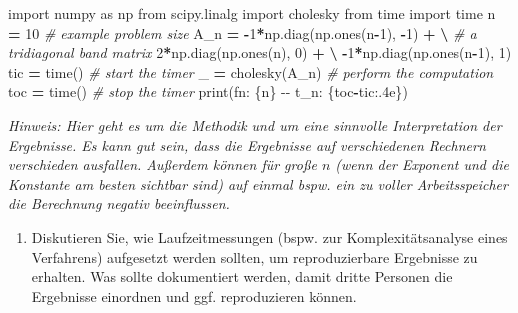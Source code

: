 \documentclass[
]{book}
\newenvironment{Shaded}{\begin{snugshade}}{\end{snugshade}}
\newcommand{\BuiltInTok}[1]{#1}
\newcommand{\CommentTok}[1]{\textcolor[rgb]{0.56,0.35,0.01}{\textit{#1}}}
\newcommand{\DecValTok}[1]{\textcolor[rgb]{0.00,0.00,0.81}{#1}}
\newcommand{\ImportTok}[1]{#1}
\newcommand{\NormalTok}[1]{#1}
\newcommand{\OperatorTok}[1]{\textcolor[rgb]{0.81,0.36,0.00}{\textbf{#1}}}
\newcommand{\SpecialCharTok}[1]{\textcolor[rgb]{0.00,0.00,0.00}{#1}}
\newcommand{\SpecialStringTok}[1]{\textcolor[rgb]{0.31,0.60,0.02}{#1}}
\providecommand{\tightlist}{%
  \setlength{\itemsep}{0pt}\setlength{\parskip}{0pt}}
\theoremstyle{definition}
\theoremstyle{definition}
\theoremstyle{definition}
\theoremstyle{definition}
\theoremstyle{remark}
\begin{document}
\begin{Shaded}
\begin{Highlighting}[]
\ImportTok{import}\NormalTok{ numpy }\ImportTok{as}\NormalTok{ np}
\ImportTok{from}\NormalTok{ scipy.linalg }\ImportTok{import}\NormalTok{ cholesky}
\ImportTok{from}\NormalTok{ time }\ImportTok{import}\NormalTok{ time}
\NormalTok{n }\OperatorTok{=} \DecValTok{10}                                  \CommentTok{\# example problem size}
\NormalTok{A\_n }\OperatorTok{=} \OperatorTok{{-}}\DecValTok{1}\OperatorTok{*}\NormalTok{np.diag(np.ones(n}\OperatorTok{{-}}\DecValTok{1}\NormalTok{), }\OperatorTok{{-}}\DecValTok{1}\NormalTok{) }\OperatorTok{+} \OperatorTok{\textbackslash{}}  \CommentTok{\# a tridiagonal band matrix}
    \DecValTok{2}\OperatorTok{*}\NormalTok{np.diag(np.ones(n), }\DecValTok{0}\NormalTok{) }\OperatorTok{+} \OperatorTok{\textbackslash{}}
    \OperatorTok{{-}}\DecValTok{1}\OperatorTok{*}\NormalTok{np.diag(np.ones(n}\OperatorTok{{-}}\DecValTok{1}\NormalTok{), }\DecValTok{1}\NormalTok{)}
\NormalTok{tic }\OperatorTok{=}\NormalTok{ time()                            }\CommentTok{\# start the timer}
\NormalTok{\_ }\OperatorTok{=}\NormalTok{ cholesky(A\_n)                       }\CommentTok{\# perform the computation}
\NormalTok{toc }\OperatorTok{=}\NormalTok{ time()                            }\CommentTok{\# stop the timer}
\BuiltInTok{print}\NormalTok{(}\SpecialStringTok{f\textquotesingle{}n: }\SpecialCharTok{\{n\}}\SpecialStringTok{ {-}{-} t\_n: }\SpecialCharTok{\{}\NormalTok{toc}\OperatorTok{{-}}\NormalTok{tic}\SpecialCharTok{:.4e\}}\SpecialStringTok{\textquotesingle{}}\NormalTok{)}
\end{Highlighting}
\end{Shaded}

\emph{Hinweis: Hier geht es um die Methodik und um eine sinnvolle Interpretation der Ergebnisse. Es kann gut sein, dass die Ergebnisse auf verschiedenen Rechnern verschieden ausfallen. Außerdem können für große \(n\) (wenn der Exponent und die Konstante am besten sichtbar sind) auf einmal bspw. ein zu voller Arbeitsspeicher die Berechnung negativ beeinflussen.}

\begin{enumerate}
\def\labelenumi{\arabic{enumi}.}
\setcounter{enumi}{3}
\tightlist
\item
  Diskutieren Sie, wie Laufzeitmessungen (bspw. zur Komplexitätsanalyse eines Verfahrens) aufgesetzt werden sollten, um reproduzierbare Ergebnisse zu erhalten. Was sollte dokumentiert werden, damit dritte Personen die Ergebnisse einordnen und ggf. reproduzieren können.
\end{enumerate}
\end{document}
